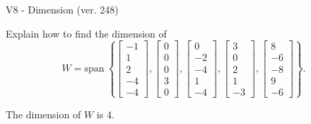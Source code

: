 \begin{exercise}
  \begin{exerciseTitle}V8 - Dimension (ver. 248)\end{exerciseTitle}
  \begin{exerciseStatement}
    Explain how to find the dimension of 
\[W=\mathrm{span}\ \left\{\left[\begin{array}{r}
-1 \\
1 \\
2 \\
-4 \\
-4
\end{array}\right] , \left[\begin{array}{r}
0 \\
0 \\
0 \\
3 \\
0
\end{array}\right] , \left[\begin{array}{r}
0 \\
-2 \\
-4 \\
1 \\
-4
\end{array}\right] , \left[\begin{array}{r}
3 \\
0 \\
2 \\
1 \\
-3
\end{array}\right] , \left[\begin{array}{r}
8 \\
-6 \\
-8 \\
9 \\
-6
\end{array}\right]\right\}.\]



  \end{exerciseStatement}
  \begin{exerciseAnswer}
   The dimension of \(W\) is  \(4\).
  


  \end{exerciseAnswer}
\end{exercise}